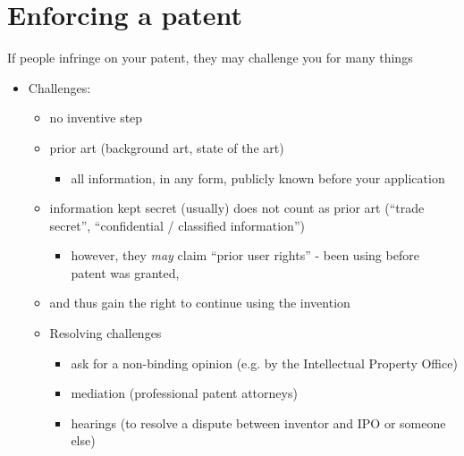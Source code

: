 \documentclass{article}
\begin{document}
\section{Enforcing a patent}
If people infringe on your patent, they may challenge you for many things
\begin{itemize}
\item Challenges:
\begin{itemize}
\item no inventive step
\item prior art (background art, state of the art)
\begin{itemize}
\item all information, in any form, publicly known before your application
\end{itemize}
\item information kept secret (usually) does not count as prior art (``trade secret'', ``confidential / classified information'')
\begin{itemize}
\item however, they \emph{may} claim ``prior user rights''  - been using before patent was granted, 
\end{itemize}
\item and thus gain the right to continue using the invention
\item Resolving challenges
\begin{itemize}
\item ask for a non-binding opinion (e.g. by the Intellectual Property Office)
\item mediation (professional patent attorneys)
\item hearings (to resolve a dispute between inventor and IPO or someone else)
\end{itemize}
\end{itemize}
\end{itemize}
\end{document}
